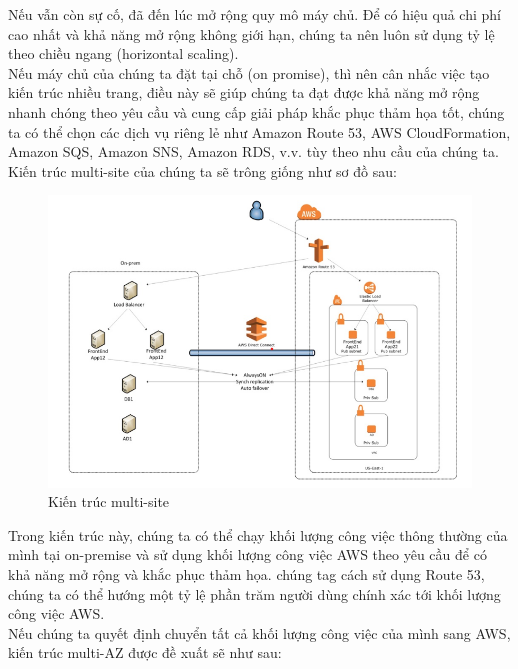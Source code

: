 \begin{itemize}
    \newline
    Nếu vẫn còn sự cố, đã đến lúc mở rộng quy mô máy chủ. Để có hiệu quả chi phí cao nhất và khả năng mở rộng không giới hạn, chúng ta nên luôn sử dụng tỷ lệ theo chiều ngang (horizontal scaling).\\[0.5cm]
    Nếu máy chủ của chúng ta đặt tại chỗ (on promise), thì nên cân nhắc việc tạo kiến trúc nhiều trang, điều này sẽ giúp chúng ta đạt được khả năng mở rộng nhanh chóng theo yêu cầu và cung cấp giải pháp khắc phục thảm họa tốt, chúng ta có thể chọn các dịch vụ riêng lẻ như Amazon Route 53, AWS CloudFormation, Amazon SQS, Amazon SNS, Amazon RDS, v.v. tùy theo nhu cầu của chúng ta.\\[0.5cm]
    Kiến trúc multi-site của chúng ta sẽ trông giống như sơ đồ sau:
    \begin{figure}[H]
        \begin{center}
        \includegraphics[scale=0.8]{images/hieu/chap-2/multi-site-architecture.png}
        \vspace*{5mm}
        \caption{Kiến trúc multi-site}
        \end{center}
    \end{figure}
        Trong kiến trúc này, chúng ta có thể chạy khối lượng công việc thông thường của mình tại on-premise và sử dụng khối lượng công việc AWS theo yêu cầu để có khả năng mở rộng và khắc phục thảm họa. chúng tag cách sử dụng Route 53, chúng ta có thể hướng một tỷ lệ phần trăm người dùng chính xác tới khối lượng công việc AWS.\\[0.5cm]
        Nếu chúng ta quyết định chuyển tất cả khối lượng công việc của mình sang AWS, kiến trúc multi-AZ được đề xuất sẽ như sau:
        \begin{figure}[H]

\end{figure}
\end{itemize}
